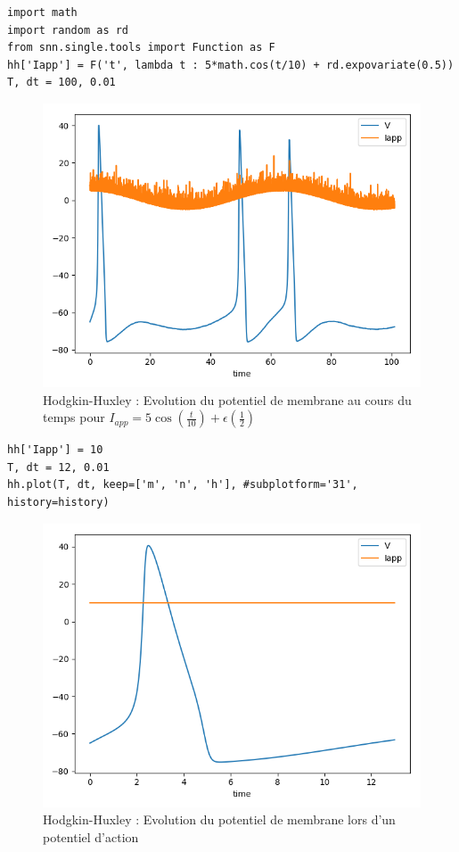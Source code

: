 \documentclass[12pt]{scrartcl}
\begin{document}
\clearpage
\begin{lstlisting}[caption = {Hodgkin-Huxley : Simulation du modèle pour $I_{app} = 5\cos(\frac{t}{10})+\epsilon(\frac12)$}]
import math
import random as rd 
from snn.single.tools import Function as F
hh['Iapp'] = F('t', lambda t : 5*math.cos(t/10) + rd.expovariate(0.5))
T, dt = 100, 0.01
\end{lstlisting}

\begin{figure}[!h]
\centering
\includegraphics[scale=0.8]{imgs/hh41.png}
\caption{Hodgkin-Huxley : Evolution du potentiel de membrane au cours du temps pour $I_{app} = 5\cos(\frac{t}{10})+\epsilon(\frac12)$}
\label{hh41}
\end{figure}

\clearpage 
\begin{lstlisting}[caption = {Hodgkin-Huxley : Evolution de m, n et h lors d'un potentiel d'action}]
hh['Iapp'] = 10
T, dt = 12, 0.01
hh.plot(T, dt, keep=['m', 'n', 'h'], #subplotform='31', 
history=history)
\end{lstlisting}

\begin{figure}[!h]
\centering
\includegraphics[scale=0.5]{imgs/hh51.png}
\caption{Hodgkin-Huxley : Evolution du potentiel de membrane lors d'un potentiel d'action}
\label{hh51}
\end{figure}
\end{document}

